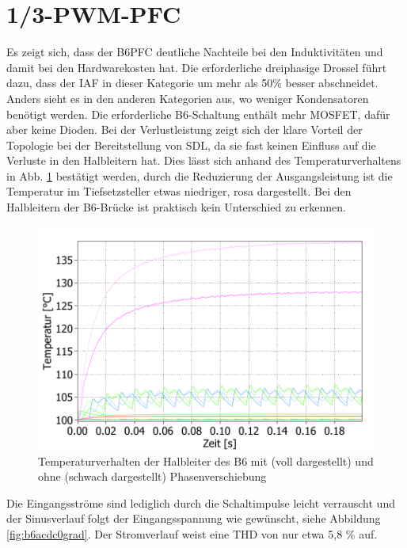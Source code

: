 \section{1/3-PWM-PFC}
	Es zeigt sich, dass der \gls{B6PFC} deutliche Nachteile bei den Induktivitäten und damit bei den Hardwarekosten hat. Die erforderliche dreiphasige Drossel führt dazu, dass der IAF in dieser Kategorie um mehr als 50\% besser abschneidet.
	Anders sieht es in den anderen Kategorien aus, wo weniger Kondensatoren benötigt werden. Die erforderliche B6-Schaltung enthält mehr \gls{MOSFET}, dafür aber keine Dioden. Bei der Verlustleistung zeigt sich der klare Vorteil der Topologie bei der Bereitstellung von \gls{SDL}, da sie fast keinen Einfluss auf die Verluste in den Halbleitern hat. Dies lässt sich anhand des Temperaturverhaltens in Abb. \ref{fig:b6temp030grad} bestätigt werden, durch die Reduzierung der Ausgangsleistung ist die Temperatur im Tiefsetzsteller etwas niedriger, rosa dargestellt. Bei den Halbleitern der B6-Brücke ist praktisch kein Unterschied zu erkennen.
	\begin{figure}[H]
		\centering
		\includegraphics[width=1\linewidth]{content/Grafiken/B6_Temp_0&30Grad}
		\caption{Temperaturverhalten der Halbleiter des B6 mit (voll dargestellt) und ohne (schwach dargestellt) Phasenverschiebung}
		\label{fig:b6temp030grad}
	\end{figure}
	Die Eingangsströme sind lediglich durch die Schaltimpulse leicht verrauscht und der Sinusverlauf folgt der Eingangsspannung wie gewünscht, siehe Abbildung \ref{fig:b6acdc0grad}.  Der Stromverlauf weist eine THD von nur etwa 5,8 \% auf. 
	
